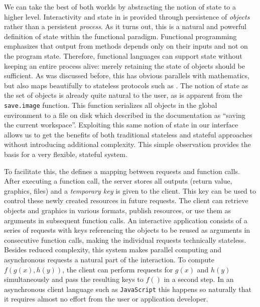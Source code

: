We can take the best of both worlds by abstracting the notion of state to a higher level. Interactivity and state in \OpenCPU is provided through persistence of \emph{objects} rather than a persistent \emph{process}. As it turns out, this is a natural and powerful definition of state within the functional paradigm. Functional programming emphasizes that output from methods depends only on their inputs and not on the program state. Therefore, functional languages can support state without keeping an entire process alive: merely retaining the state of objects should be sufficient. As was discussed before, this has obvious parallels with mathematics, but also maps beautifully to stateless protocols such as \HTTP. The notion of state as the set of objects is already quite natural to the \R user, as is apparent from the \texttt{save.image} function. This function serializes all objects in the global environment to a file on disk which described in the documentation as ``saving the current workspace''. Exploiting this same notion of state in our interface allows us to get the benefits of both traditional stateless and stateful approaches without introducing additional complexity. This simple observation provides the basis for a very flexible, stateful \RPC system.

To facilitate this, the \OpenCPU \API defines a mapping between \HTTP requests and \R function calls. After executing a function call, the server stores all outputs (return value, graphics, files) and a \emph{temporary key} is given to the client. This key can be used to control these newly created resources in future requests. The client can retrieve objects and graphics in various formats, publish resources, or use them as arguments in subsequent function calls. An interactive application consists of a series of \RPC requests with keys referencing the objects to be reused as arguments in consecutive function calls, making the individual requests technically stateless. Besides reduced complexity, this system makes parallel computing and asynchronous requests a natural part of the interaction. To compute $f(g(x), h(y))$, the client can perform \RPC requests for $g(x)$ and $h(y)$ simultaneously and pass the resulting keys to $f()$ in a second step. In an asynchronous client language such as \texttt{JavaScript} this happens so naturally that it requires almost no effort from the user or application developer.


